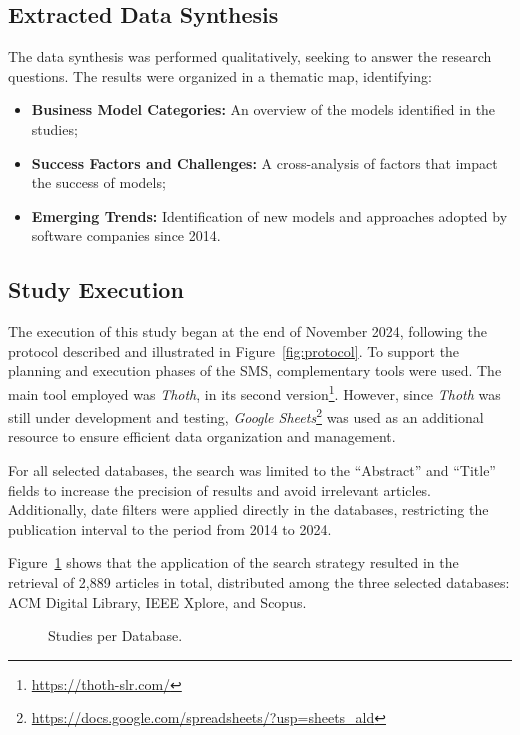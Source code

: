\documentclass[journal]{IEEEtran}
\begin{document}
\subsection{Extracted Data Synthesis}\label{sec:data-synthesis}

The data synthesis was performed qualitatively, seeking to answer the research questions. The results were organized in a thematic map, identifying:

\begin{itemize}
    \item \textbf{Business Model Categories:} An overview of the models identified in the studies;
    \item \textbf{Success Factors and Challenges:} A cross-analysis of factors that impact the success of models;
    \item \textbf{Emerging Trends:} Identification of new models and approaches adopted by software companies since 2014.
\end{itemize}

\subsection{Study Execution}\label{sec:execution}

The execution of this study began at the end of November 2024, following the protocol described and illustrated in Figure~\ref{fig:protocol}.
To support the planning and execution phases of the SMS, complementary tools were used.
The main tool employed was \textit{Thoth}, in its second version\footnote{\url{https://thoth-slr.com/}}.
However, since \textit{Thoth} was still under development and testing, \textit{Google Sheets}\footnote{\url{https://docs.google.com/spreadsheets/?usp=sheets_ald}} was used as an additional resource to ensure efficient data organization and management.

For all selected databases, the search was limited to the ``Abstract'' and ``Title'' fields to increase the precision of results and avoid irrelevant articles.
Additionally, date filters were applied directly in the databases, restricting the publication interval to the period from 2014 to 2024.

Figure~\ref{fig:papers-per-db} shows that the application of the search strategy resulted in the retrieval of 2,889 articles in total, distributed among the three selected databases: ACM Digital Library, IEEE Xplore, and Scopus.

\begin{figure}[!htb]
    \centering
    
    \caption{Studies per Database.}
    \label{fig:papers-per-db}
\end{figure}
\end{document}
